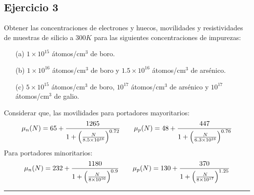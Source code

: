 \subsection{Ejercicio 3}
Obtener las concentraciones de electrones y huecos, movilidades y resistividades de muestras de silicio a \(300 K\) para las siguientes concentraciones de impurezas:
\begin{itemize}
	\item[(a)] \(1 \times 10^{15}\) átomos/cm$^3$ de boro.
	\item[(b)] \(1 \times 10^{16}\) átomos/cm$^3$ de boro y \(1.5 \times 10^{16}\) átomos/cm$^3$ de arsénico.
	\item[(c)] \(5 \times 10^{15}\) átomos/cm$^3$ de boro, \(10^{17}\) átomos/cm$^3$ de arsénico y \(10^{17}\) átomos/cm$^3$ de galio.
\end{itemize}
Considerar que, las movilidades para portadores mayoritarios:
\begin{equation}
	\mu_n (N) = 65  + \frac{1265}{1+\left( \frac{N}{8.5\times 10^{16}} \right)^{0.72}} \qquad 
	\mu_p (N) = 48  + \frac{447}{1+\left( \frac{N}{6.3\times 10^{16}} \right)^{0.76}}
\end{equation}
Para portadores minoritarios:
\begin{equation}
	\mu_n (N) = 232  + \frac{1180}{1+\left( \frac{N}{8\times 10^{16}} \right)^{0.9}} \qquad 
	\mu_p (N) = 130  + \frac{370}{1+\left( \frac{N}{8\times 10^{17}} \right)^{1.25}}
\end{equation}


\rule{\textwidth}{0.1pt} \\[2pt]

